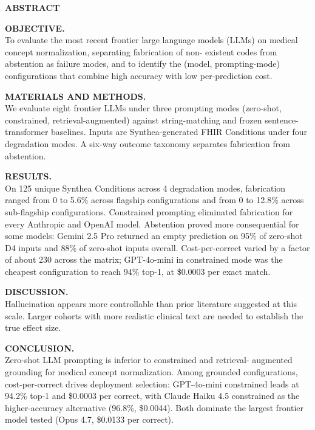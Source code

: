 %
%

\begin{center}
{\Large\bfseries ABSTRACT\par}
\end{center}

\noindent\textbf{OBJECTIVE.}\\
To evaluate the most recent frontier large language models (LLMs)
on medical concept normalization, separating fabrication of non-
existent codes from abstention as failure modes, and to identify
the (model, prompting-mode) configurations that combine high
accuracy with low per-prediction cost.

\medskip
\noindent\textbf{MATERIALS AND METHODS.}\\
We evaluate eight frontier LLMs under three prompting modes
(zero-shot, constrained, retrieval-augmented) against
string-matching and frozen sentence-transformer baselines.
Inputs are Synthea-generated FHIR Conditions under four
degradation modes. A six-way outcome taxonomy separates
fabrication from abstention.

\medskip
\noindent\textbf{RESULTS.}\\
On 125 unique Synthea Conditions across 4 degradation modes,
fabrication ranged from 0 to 5.6\% across flagship configurations
and from 0 to 12.8\% across sub-flagship configurations.
Constrained prompting eliminated fabrication for every Anthropic
and OpenAI model. Abstention proved more consequential for some
models: Gemini 2.5 Pro returned an empty prediction on 95\% of
zero-shot D4 inputs and 88\% of zero-shot inputs overall.
Cost-per-correct varied by a factor of about 230 across the
matrix; GPT-4o-mini in constrained mode was the cheapest
configuration to reach 94\% top-1, at \$0.0003 per exact match.

\medskip
\noindent\textbf{DISCUSSION.}\\
Hallucination appears more controllable than prior literature
suggested at this scale. Larger cohorts with more realistic
clinical text are needed to establish the true effect size.

\medskip
\noindent\textbf{CONCLUSION.}\\
Zero-shot LLM prompting is inferior to constrained and retrieval-
augmented grounding for medical concept normalization. Among grounded configurations,
cost-per-correct drives deployment selection: GPT-4o-mini
constrained leads at 94.2\% top-1 and \$0.0003 per correct, with
Claude Haiku 4.5 constrained as the higher-accuracy alternative
(96.8\%, \$0.0044). Both dominate the largest frontier model
tested (Opus 4.7, \$0.0133 per correct).
